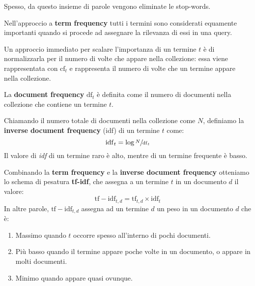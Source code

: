 \documentclass[\main/main.tex]{subfiles}
\begin{document}
\begin{multicols}{2}
\begin{definition}
    Spesso, da questo insieme di parole vengono eliminate le stop-words.
\end{definition}
\begin{observation}
    Nell'approccio a \textbf{term frequency} tutti i termini sono considerati equamente importanti quando si procede ad assegnare la rilevanza di essi in una query.
\end{observation}
\begin{definition}
    Un approccio immediato per scalare l'importanza di un termine \(t\) è di normalizzarla per il numero di volte che appare nella collezione: essa viene rappresentata con \(\text{cf}_t\) e rappresenta il numero di volte che un termine appare nella collezione.
\end{definition}
\begin{definition}
    La \textbf{document frequency} \(\text{df}_t\) è definita come il numero di documenti nella collezione che contiene un termine \(t\).
\end{definition}
\begin{definition}
    Chiamando il numero totale di documenti nella collezione come \(N\), definiamo la \textbf{inverse document frequency} (idf) di un termine \(t\) come:
    \[
        \mathrm{idf}_{t}=\log \sfrac{N}{\mathrm{df}_{t}}
    \]
    Il valore di \textit{idf} di un termine raro è alto, mentre di un termine frequente è basso.
\end{definition}
\begin{definition}[TF-IDF]
    Combinando la \textbf{term frequency} e la \textbf{inverse document frequency} otteniamo lo schema di pesatura \textbf{tf-idf}, che assegna a un termine \(t\) in un documento \(d\) il valore:
    \[
        \mathrm{tf}-\mathrm{idf}_{t, d}=\mathrm{tf}_{t, d} \times \mathrm{idf}_{t}
    \]
    In altre parole, \(\mathrm{tf}-\mathrm{idf}_{t, d}\) assegna ad un termine \(d\) un peso in un documento \(d\) che è:
    \begin{enumerate}
        \item Massimo quando \(t\) occorre spesso all'interno di pochi documenti.
        \item Più basso quando il termine appare poche volte in un documento, o appare in molti documenti.
        \item Minimo quando appare quasi ovunque.
    \end{enumerate}
\end{definition}

\end{multicols}
\end{document}
